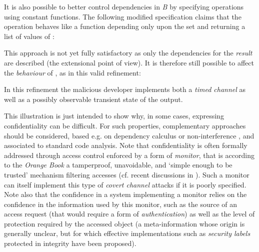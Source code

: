 \documentclass[conference]{IEEEtran}
\begin{document}
It is also possible to better control dependencies in \emph{B} by specifying operations using
constant functions. The following modified specification claims that the operation
{\small} behaves like a function depending only upon the set
{\small} and returning a list of values of {\small}:

This approach is not yet fully satisfactory as only the dependencies for the \emph{result} are
described (the extensional point of view). It is therefore still possible to affect the
\emph{behaviour} of {\small}, as in this valid refinement:

In this refinement the malicious developer implements both a \emph{timed channel} as well as
a possibly observable transient state of the output.

This illustration is just intended to show why, in some cases, expressing confidentiality
can be difficult. For such properties, complementary approaches should be considered, based
e.g. on dependency calculus or non-interference \cite{abadi99core,goguen82}, and associated to
standard code analysis. Note that confidentiality is often formally addressed through access
control enforced by a form of \emph{monitor}, that is according to the \emph{Orange Book} a
tamperproof, unavoidable, and `simple enough to be trusted' mechanism filtering accesses (cf.
recent discussions in
\cite{DBLP:conf/b/BenaissaCM07,DBLP:conf/b/Haddad07,DBLP:conf/b/HoffmannHGB07}). Such a
monitor can itself implement this type of \emph{covert channel} attacks if it is poorly
specified. Note also that the confidence in a system implementing a monitor relies on the
confidence in the information used by this monitor, such as the source of an access request
(that would require a form of \emph{authentication}) as well as the level of protection
required by the accessed object (a meta-information whose origin is generally unclear, but for
which effective implementations such as \emph{security labels} protected in integrity have
been proposed).
\end{document}
